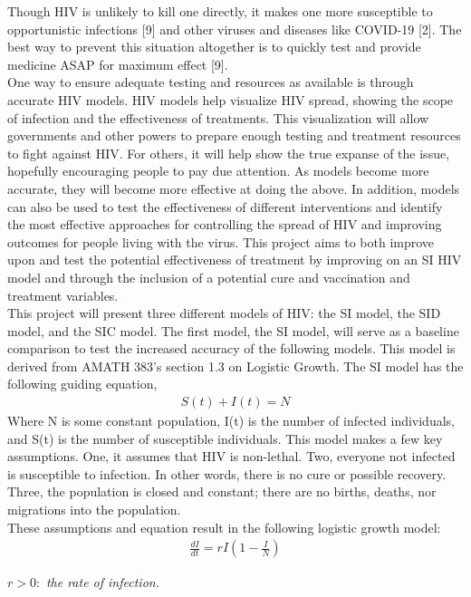 \documentclass[a4paper, final, 12pt]{article}
\numberwithin{equation}{section}
\begin{document}
Though HIV is unlikely to kill one directly, it makes one more susceptible to opportunistic infections [9] and other viruses and diseases like COVID-19 [2]. The best way to prevent this situation altogether is to quickly test and provide medicine ASAP for maximum effect [9]. \\

One way to ensure adequate testing and resources as available is through accurate HIV models. HIV models help visualize HIV spread, showing the scope of infection and the effectiveness of treatments. This visualization will allow governments and other powers to prepare enough testing and treatment resources to fight against HIV. For others, it will help show the true expanse of the issue, hopefully encouraging people to pay due attention. As models become more accurate, they will become more effective at doing the above. In addition, models can also be used to test the effectiveness of different interventions and identify the most effective approaches for controlling the spread of HIV and improving outcomes for people living with the virus. This project aims to both improve upon and test the potential effectiveness of treatment by improving on an SI HIV model and through the inclusion of a potential cure and vaccination and treatment variables. \\

This project will present three different models of HIV: the SI model, the SID model, and the SIC model. The first model, the SI model, will serve as a baseline comparison to test the increased accuracy of the following models. This model is derived from AMATH 383's section 1.3 on Logistic Growth. The SI model has the following guiding equation,
    \begin{align}
        S(t) + I(t) = N
    \end{align}
\hspace{22pt} Where N is some constant population, I(t) is the number of infected individuals, and S(t) is the number of susceptible individuals. This model makes a few key assumptions. One, it assumes that HIV is non-lethal. Two, everyone not infected is susceptible to infection. In other words, there is no cure or possible recovery. Three, the population is closed and constant; there are no births, deaths, nor migrations into the population. \\

These assumptions and equation result in the following logistic growth model:
\begin{align}
    \frac{dI}{dt} = r I (1 - \frac{I}{N})
\end{align}
    \begin{center}
        \(r > 0: \) \textit{the rate of infection.}
    \end{center}
\end{document}
